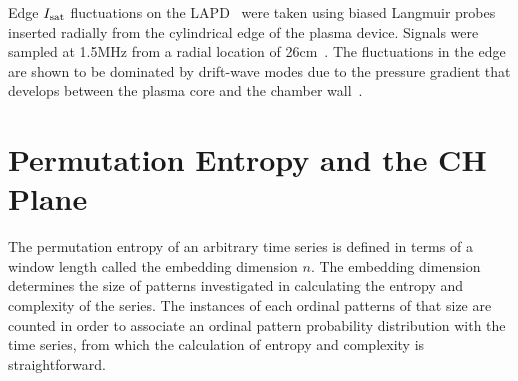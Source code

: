 \documentclass[aps,pre,twocolumn,secnumarabic,nobalancelastpage,amsmath,amssymb,
nofootinbib]{revtex4-1}
\begin{document}

Edge $I_{\rm sat}$ fluctuations on the LAPD~\cite{gekelman1991} were taken using biased Langmuir probes inserted radially from the cylindrical edge of the plasma device. Signals were sampled at 1.5MHz from a radial location of 26cm~\cite{schaffner2012}. The fluctuations in the edge are shown to be dominated by drift-wave modes due to the pressure gradient that develops between the plasma core and the chamber wall~\cite{maggs1996}.


\section{Permutation Entropy and the CH Plane}
The permutation entropy of an arbitrary time series is defined in terms of a window length called the embedding dimension $n$. The embedding dimension determines the size of patterns investigated in calculating the entropy and complexity of the series. The instances of each ordinal patterns of that size are counted in order to associate an ordinal pattern probability distribution with the time series, from which the calculation of entropy and complexity is straightforward.
\end{document}

